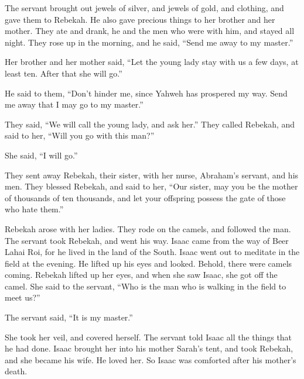 {The servant brought out jewels of silver, and jewels of gold, and clothing, and gave them to Rebekah. He also gave precious things to her brother and her mother.
They ate and drank, he and the men who were with him, and stayed all night. They rose up in the morning, and he said, “Send me away to my master.”
\par }{\PP {}Her brother and her mother said, “Let the young lady stay with us a few days, at least ten. After that she will go.”
\par }{\PP {}He said to them, “Don’t hinder me, since Yahweh has prospered my way. Send me away that I may go to my master.”
\par }{\PP {}They said, “We will call the young lady, and ask her.”
They called Rebekah, and said to her, “Will you go with this man?”
\par }{\PP She said, “I will go.”
\par }{\PP {}They sent away Rebekah, their sister, with her nurse, Abraham’s servant, and his men.
They blessed Rebekah, and said to her, “Our sister, may you be the mother of thousands of ten thousands, and let your offspring possess the gate of those who hate them.”
\par }{\PP {}Rebekah arose with her ladies. They rode on the camels, and followed the man. The servant took Rebekah, and went his way.
Isaac came from the way of Beer Lahai Roi, for he lived in the land of the South.
Isaac went out to meditate in the field at the evening. He lifted up his eyes and looked. Behold, there were camels coming.
Rebekah lifted up her eyes, and when she saw Isaac, she got off the camel.
She said to the servant, “Who is the man who is walking in the field to meet us?”
\par }{\PP The servant said, “It is my master.”
\par }{\PP She took her veil, and covered herself.
The servant told Isaac all the things that he had done.
Isaac brought her into his mother Sarah’s tent, and took Rebekah, and she became his wife. He loved her. So Isaac was comforted after his mother’s death.

}
